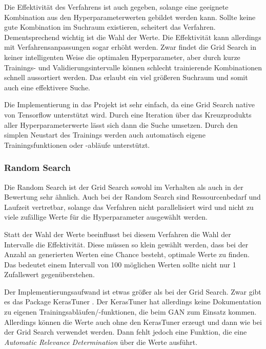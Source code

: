 Die Effektivität des Verfahrens ist auch gegeben, solange eine geeignete Kombination aus den Hyperparameterwerten gebildet werden kann.
Sollte keine gute Kombination im Suchraum existieren, scheitert das Verfahren.
Dementsprechend wichtig ist die Wahl der Werte.
Die Effektivität kann allerdings mit Verfahrensanpassungen sogar erhöht werden.
Zwar findet die Grid Search in keiner intelligenten Weise die optimalen Hyperparameter, aber durch kurze Trainings- und Validierungsintervalle können schlecht trainierende Kombinationen schnell aussortiert werden.
Das erlaubt ein viel größeren Suchraum und somit auch eine effektivere Suche.
\newline

Die Implementierung in das Projekt ist sehr einfach, da eine Grid Search native von Tensorflow unterstützt wird.
Durch eine Iteration über das Kreuzprodukts aller Hyperparameterwerte lässt sich dann die Suche umsetzen.
Durch den simplen Neustart des Trainings werden auch automatisch eigene Trainingsfunktionen oder -abläufe unterstützt.

\subsubsection{Random Search}
Die Random Search ist der Grid Search sowohl im Verhalten als auch in der Bewertung sehr ähnlich.
Auch bei der Random Search sind Ressourcenbedarf und Laufzeit vertretbar, solange das Verfahren nicht parallelisiert wird und nicht zu viele zufällige Werte für die Hyperparameter ausgewählt werden.
\newline

Statt der Wahl der Werte beeinflusst bei diesem Verfahren die Wahl der Intervalle die Effektivität.
Diese müssen so klein gewählt werden, dass bei der Anzahl an generierten Werten eine Chance besteht, optimale Werte zu finden.
Das bedeutet einem Intervall von 100 möglichen Werten sollte nicht nur 1 Zufallswert gegenüberstehen. 
\newline

Der Implementierungsaufwand ist etwas größer als bei der Grid Search.
Zwar gibt es das Package KerasTuner \cite{omalley2019kerastuner}.
Der KerasTuner hat allerdings keine Dokumentation zu eigenen Trainingsabläufen/-funktionen, die beim GAN zum Einsatz kommen.
Allerdings können die Werte auch ohne den KerasTuner erzeugt und dann wie bei der Grid Search verwendet werden.
Dann fehlt jedoch eine Funktion, die eine \textit{Automatic Relevance Determination} über die Werte ausführt.

